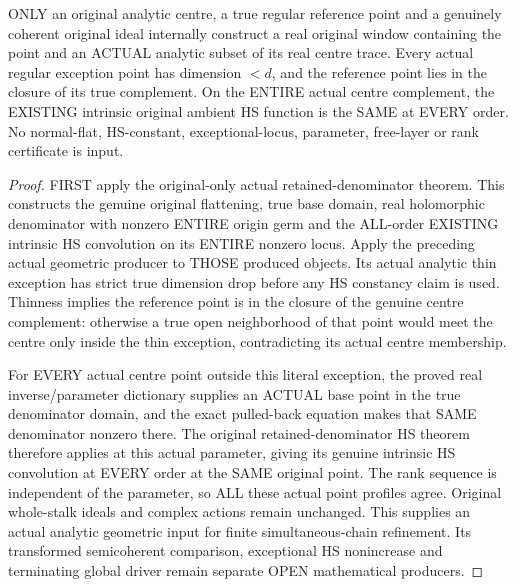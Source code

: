 \begin{theorem}
\label{hir:original-actual-centre-analytic-exception-all-intrinsic-hs}
\leanok
ONLY an original analytic centre, a true regular reference point and a
genuinely coherent original ideal internally construct a real original
window containing the point and an ACTUAL analytic subset of its real
centre trace. Every actual regular exception point has dimension $<d$,
and the reference point lies in the closure of its true complement.
On the ENTIRE actual centre complement, the EXISTING intrinsic original
ambient HS function is the SAME at EVERY order. No normal-flat, HS-constant,
exceptional-locus, parameter, free-layer or rank certificate is input.
\end{theorem}
\begin{proof}
FIRST apply the original-only actual retained-denominator theorem. This
constructs the genuine original flattening, true base domain, real
holomorphic denominator with nonzero ENTIRE origin germ and the ALL-order
EXISTING intrinsic HS convolution on its ENTIRE nonzero locus.
Apply the preceding actual geometric producer to THOSE produced objects.
Its actual analytic thin exception has strict true dimension drop before
any HS constancy claim is used. Thinness implies the reference point is
in the closure of the genuine centre complement: otherwise a true open
neighborhood of that point would meet the centre only inside the thin
exception, contradicting its actual centre membership.

For EVERY actual centre point outside this literal exception, the proved
real inverse/parameter dictionary supplies an ACTUAL base point in the
true denominator domain, and the exact pulled-back equation makes that
SAME denominator nonzero there. The original retained-denominator HS
theorem therefore applies at this actual parameter, giving its genuine
intrinsic HS convolution at EVERY order at the SAME original point.
The rank sequence is independent of the parameter, so ALL these actual
point profiles agree. Original whole-stalk ideals and complex actions
remain unchanged. This supplies an actual analytic geometric input for
finite simultaneous-chain refinement. Its transformed semicoherent
comparison, exceptional HS nonincrease and terminating global driver
remain separate OPEN mathematical producers.
\end{proof}
